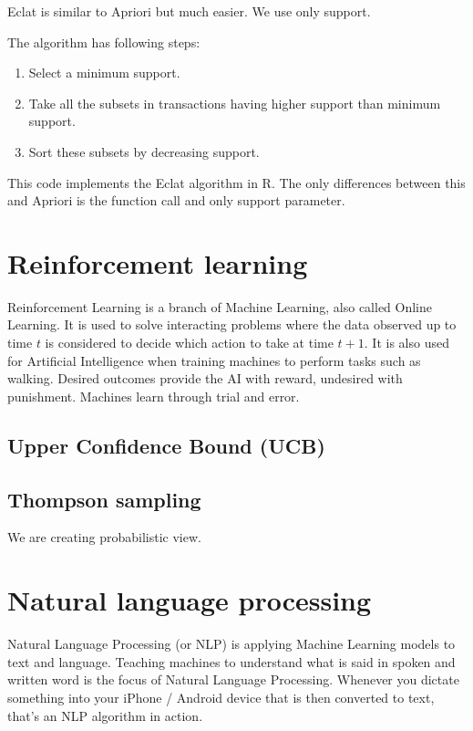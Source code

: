 \documentclass[runningheads,a4paper]{llncs}
\begin{document}
Eclat is similar to Apriori but much easier. We use only support.

The algorithm has following steps:
\begin{enumerate}
\item Select a minimum support.
\item Take all the subsets in transactions having higher support than minimum support.
\item Sort these subsets by decreasing support.
\end{enumerate}

This code implements the Eclat algorithm in R. The only differences between this and Apriori is the function call and only support parameter.

\lstset{basicstyle=\large}
 

\newpage

\section{Reinforcement learning}

Reinforcement Learning is a branch of Machine Learning, also called Online Learning. It is used to solve interacting problems where the data observed up to time $t$ is considered to decide which action to take at time $t + 1$. It is also used for Artificial Intelligence when training machines to perform tasks such as walking. Desired outcomes provide the AI with reward, undesired with punishment. Machines learn through trial and error.

\subsection{Upper Confidence Bound (UCB)}


\subsection{Thompson sampling}
We are creating probabilistic view.

\newpage

\section{Natural language processing}
Natural Language Processing (or NLP) is applying Machine Learning models to text and language. Teaching machines to understand what is said in spoken and written word is the focus of Natural Language Processing. Whenever you dictate something into your iPhone / Android device that is then converted to text, that’s an NLP algorithm in action.
\end{document}
